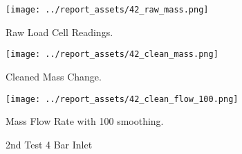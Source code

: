 \begin{figure}[htbp]
    \centering

    \begin{minipage}{0.3\textwidth}
        \centering
        \texttt{[image: ../report\_assets/42\_raw\_mass.png]}
        \caption*{Raw Load Cell Readings.}
    \end{minipage}
    \hfill
    \begin{minipage}{0.3\textwidth}
        \centering
        \texttt{[image: ../report\_assets/42\_clean\_mass.png]}
        \caption*{Cleaned Mass Change.}
    \end{minipage}
    \hfill
    \begin{minipage}{0.3\textwidth}
        \centering
        \texttt{[image: ../report\_assets/42\_clean\_flow\_100.png]}
        \caption*{Mass Flow Rate with 100 smoothing.}
    \end{minipage}
    \caption{2nd Test 4 Bar Inlet}
    
\end{figure}\label{fig:42}

